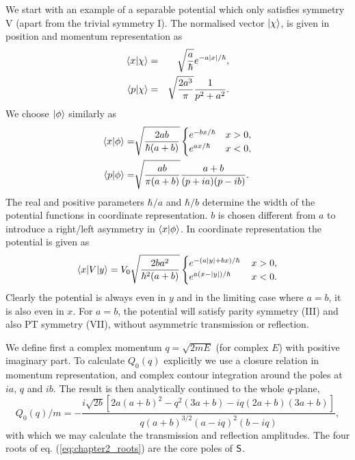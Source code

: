 We start with an example of a separable potential which only satisfies symmetry V (apart from the trivial symmetry I). The normalised vector $\ket{\chi}$, is given in position and momentum representation as
%
\begin{eqnarray}
	\braket{x}{\chi}&=&\sqrt{\frac{a}{\hbar}} e^{-a \left| x \right|/\hbar},
	\nonumber \\
	\braket{p}{\chi}&=& \sqrt{\frac{2 a^3}{\pi}} \frac{1}{p^2+a^2}.
\end{eqnarray}
%
We choose $\ket{\phi}$ similarly as
%
\begin{eqnarray}
	\braket{x}{\phi}=&\sqrt{\frac{2ab}{\hbar (a+b)}} \begin{cases}
	e^{-b x/\hbar} &x>0,\\ e^{a x/\hbar}  &x<0,
	\end{cases}\nonumber \\
	\braket{p}{\phi}=& \sqrt{\frac{ab}{\pi (a+b)}}\frac{a+b}{(p+i a)(p-i b)}.
\end{eqnarray}
%
The real and positive parameters $\hbar/ a$ and $\hbar/ b$ determine the width of the potential functions in coordinate representation.
$b$ is chosen different from $a$ to introduce a right/left  asymmetry in $\braket{x}{\phi}$.
In coordinate representation the potential is given as
%
\begin{eqnarray}
	\la x|V|y\ra = V_{0} \sqrt{\frac{2 b a^2}{\hbar^2 (a+b)}} \begin{cases}
	e^{-(a \left| y \right|+b x)/\hbar} \, &x>0,\\ e^{a (x-\left| y \right|)/\hbar} \,  &x<0.
\end{cases} \label{TRpot}
\end{eqnarray}
%
Clearly the potential is always even in $y$ and in the limiting case where $a=b$, it is also even in $x$. For $a=b$, the potential will satisfy parity symmetry (III) and also PT symmetry (VII), without asymmetric transmission or reflection.

We define first a complex momentum $q=\sqrt{2 m E}$ (for complex $E$) with positive imaginary part.
To calculate $Q_{0}(q)$ explicitly we use a closure relation in momentum representation, and
complex contour integration around the poles at $ia$, $q$ and $ib$.
The result is then analytically continued to the whole $q$-plane,
%
\begin{equation}
Q_{0}(q)/m = -\frac{i \sqrt{2b} \left[2 a (a+b)^2-q^2 (3 a+b)-i q (2 a+b) (3 a+b)\right]}{q (a+b)^{3/2} (a-i q)^2 (b-i q)},
\label{eq:chapter2_ResolvantVSymm}
\end{equation}
%
with which we may calculate the transmission and reflection amplitudes.
The four roots of eq. (\ref{eq:chapter2_roots}) are the core poles of ${\sf S}$.

